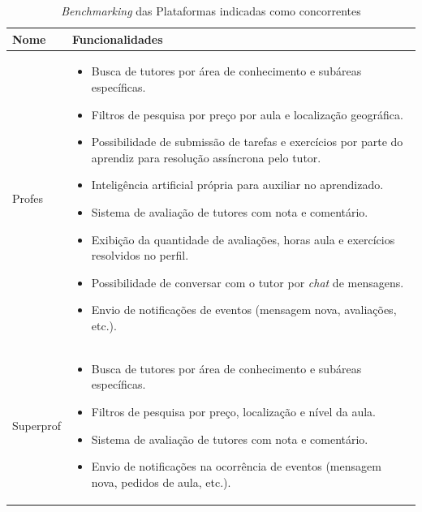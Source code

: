 \begin{table}[H]
    \centering
    \caption{\textit{Benchmarking} das Plataformas indicadas como concorrentes} %
    \label{tab:benchmarking}
    
    \begin{tabularx}{\linewidth}{|l|X|}
        \hline
        \textbf{Nome} & \textbf{Funcionalidades} \\
        \hline
        Profes & 
        \begin{itemize}[nosep, leftmargin=*, after=\vspace{\baselineskip}]
            \item Busca de tutores por área de conhecimento e subáreas específicas.
            \item Filtros de pesquisa por preço por aula e localização geográfica.
            \item Possibilidade de submissão de tarefas e exercícios por parte do aprendiz para resolução assíncrona pelo tutor.
            \item Inteligência artificial própria para auxiliar no aprendizado.
            \item Sistema de avaliação de tutores com nota e comentário.
            \item Exibição da quantidade de avaliações, horas aula e exercícios resolvidos no perfil.
            \item Possibilidade de conversar com o tutor por \textit{chat} de mensagens.
            \item Envio de notificações de eventos (mensagem nova, avaliações, etc.).
        \end{itemize}  
        \\
        \hline
        Superprof & 
        \begin{itemize}[nosep, leftmargin=*, after=\vspace{\baselineskip}]
            \item Busca de tutores por área de conhecimento e subáreas específicas.
            \item Filtros de pesquisa por preço, localização e nível da aula.
            \item Sistema de avaliação de tutores com nota e comentário.
            \item Envio de notificações na ocorrência de eventos (mensagem nova, pedidos de aula, etc.).

\end{itemize}
\end{tabularx}
\end{table}
